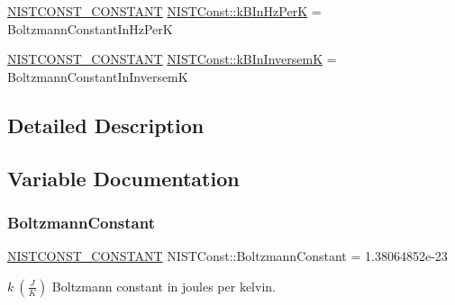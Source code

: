 \begin{DoxyCompactItemize}
\item 
\mbox{\hyperlink{group___n_i_s_t_const-_macros_ga2b0fc1d7452373f816175dd86ce26729}{N\+I\+S\+T\+C\+O\+N\+S\+T\+\_\+\+C\+O\+N\+S\+T\+A\+NT}} \mbox{\hyperlink{group___n_i_s_t_const-_boltzmann_constant_gada6cdc6c5e57c4feb627847e83f00837}{N\+I\+S\+T\+Const\+::k\+B\+In\+Hz\+PerK}} = Boltzmann\+Constant\+In\+Hz\+PerK
\item 
\mbox{\hyperlink{group___n_i_s_t_const-_macros_ga2b0fc1d7452373f816175dd86ce26729}{N\+I\+S\+T\+C\+O\+N\+S\+T\+\_\+\+C\+O\+N\+S\+T\+A\+NT}} \mbox{\hyperlink{group___n_i_s_t_const-_boltzmann_constant_ga2c0dddb127fe4e8eab50714b98b122b3}{N\+I\+S\+T\+Const\+::k\+B\+In\+InversemK}} = Boltzmann\+Constant\+In\+InversemK
\end{DoxyCompactItemize}


\subsection{Detailed Description}


\subsection{Variable Documentation}
\mbox{\label{group___n_i_s_t_const-_boltzmann_constant_ga9a66c4988ef0f1d8298d0f43ccea6f1f}} 
\subsubsection{\texorpdfstring{Boltzmann\+Constant}{BoltzmannConstant}}
{\footnotesize\ttfamily \mbox{\hyperlink{group___n_i_s_t_const-_macros_ga2b0fc1d7452373f816175dd86ce26729}{N\+I\+S\+T\+C\+O\+N\+S\+T\+\_\+\+C\+O\+N\+S\+T\+A\+NT}} N\+I\+S\+T\+Const\+::\+Boltzmann\+Constant = 1.\+38064852e-\/23}

$k \ (\frac{J}{K})$ Boltzmann constant in joules per kelvin. \mbox{\label{group___n_i_s_t_const-_boltzmann_constant_ga8c0cb1b4b0d54e1a5bf735efaef8d349}} 
